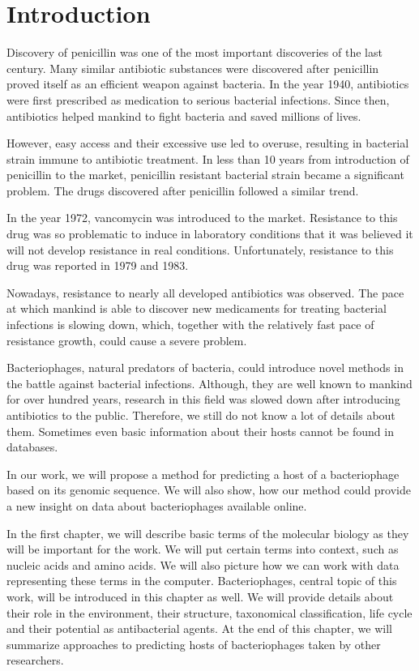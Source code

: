 \chapter*{Introduction} %

Discovery of penicillin was one of the most important discoveries of the last century.
Many similar antibiotic substances were discovered after penicillin proved itself as an efficient weapon against bacteria.
In the year 1940, antibiotics were first prescribed as medication to serious bacterial infections.
Since then, antibiotics helped mankind to fight bacteria and saved millions of lives.

However, easy access and their excessive use led to overuse, resulting in bacterial strain immune to antibiotic treatment.
In less than 10 years from introduction of penicillin to the market, penicillin resistant bacterial strain became a significant problem.
The drugs discovered after penicillin followed a similar trend.

In the year 1972, vancomycin was introduced to the market.
Resistance to this drug was so problematic to induce in laboratory conditions that it was believed it will not develop resistance in real conditions.
Unfortunately, resistance to this drug was reported in 1979 and 1983.

Nowadays, resistance to nearly all developed antibiotics was observed.
The pace at which mankind is able to discover new medicaments for treating bacterial infections is slowing down, which, together with the relatively fast pace of resistance growth, could cause a severe problem.

Bacteriophages, natural predators of bacteria, could introduce novel methods in the battle against bacterial infections.
Although, they are well known to mankind for over hundred years, research in this field was slowed down after introducing antibiotics to the public.
Therefore, we still do not know a lot of details about them.
Sometimes even basic information about their hosts cannot be found in databases.

In our work, we will propose a method for predicting a host of a bacteriophage based on its genomic sequence.
We will also show, how our method could provide a new insight on data about bacteriophages available online.

In the first chapter, we will describe basic terms of the molecular biology as they will be important for the work.
We will put certain terms into context, such as nucleic acids and amino acids.
We will also picture how we can work with data representing these terms in the computer.
Bacteriophages, central topic of this work, will be introduced in this chapter as well.
We will provide details about their role in the environment, their structure, taxonomical classification, life cycle and their potential as antibacterial agents.
At the end of this chapter, we will summarize approaches to predicting hosts of bacteriophages taken by other researchers.


